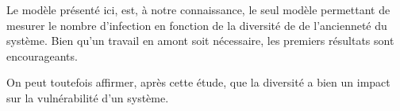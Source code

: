 Le modèle présenté ici, est, à notre connaissance, le seul modèle permettant de mesurer le nombre d'infection en fonction de la
diversité de de l'ancienneté du système. Bien qu'un travail en amont soit nécessaire, les premiers résultats sont encourageants. 
\newline

On peut toutefois affirmer, après cette étude, que la diversité a bien un impact sur la vulnérabilité d'un système.

